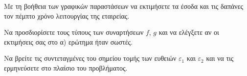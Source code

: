 \begin{alist}
\item Με τη βοήθεια των γραφικών παραστάσεων να εκτιμήσετε τα έσοδα και τις δαπάνες τον πέμπτο χρόνο λειτουργίας της εταιρείας.

\item
\begin{rlist}
\item Να προσδιορίσετε τους τύπους των συναρτήσεων $f$, $g$ και να ελέγξετε αν οι εκτιμήσεις σας στο α) ερώτημα ήταν σωστές.

\item Να βρείτε τις συντεταγμένες του σημείου τομής των ευθειών $\varepsilon_1$ και $\varepsilon_2$ και να τις ερμηνεύσετε στο πλαίσιο του προβλήματος.

\end{rlist}
\end{alist}

